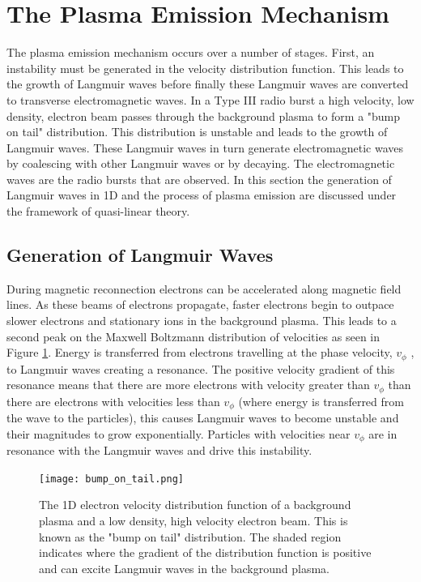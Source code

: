 \section{The Plasma Emission Mechanism}
\label{sec:plasma_emission}
The plasma emission mechanism occurs over a number of stages. First, an instability must be generated in the velocity distribution function. This leads to the growth of Langmuir waves before finally these Langmuir waves are converted to transverse electromagnetic waves. In a Type III radio burst a high velocity, low density, electron beam passes through the background plasma to form a "bump on tail" distribution. This distribution is unstable and leads to the growth of Langmuir waves. These Langmuir waves in turn generate electromagnetic waves by coalescing with other Langmuir waves or by decaying. The electromagnetic waves are the radio bursts that are observed. In this section the generation of Langmuir waves in 1D and the process of plasma emission are discussed under the framework of quasi-linear theory.

\subsection{Generation of Langmuir Waves}
During magnetic reconnection electrons can be accelerated along magnetic field lines. As these beams of electrons propagate, faster electrons begin to outpace slower electrons and stationary ions in the background plasma. This leads to a second peak on the Maxwell Boltzmann distribution of velocities as seen in Figure \ref{fig:bumpontail}. Energy is transferred from electrons travelling at the phase velocity, $v_{\phi}$ , to Langmuir waves creating a resonance.
The positive velocity gradient of this resonance means that there are more electrons with velocity greater than $v_{\phi}$ than there are electrons with velocities less than  $v_{\phi}$ (where energy is transferred from the wave to the particles), this causes Langmuir waves to become unstable and their magnitudes to grow exponentially. Particles with velocities near $v_{\phi}$ are in resonance with the Langmuir waves and drive this instability.

\begin{figure}[ht]
\centering
\texttt{[image: bump\_on\_tail.png]}
\caption[A "bump on tail" distribution.]{The 1D electron velocity distribution function of a background plasma and a low density, high velocity electron beam. This is known as the "bump on tail" distribution. The shaded region indicates where the gradient of the distribution function is positive and can excite Langmuir waves in the background plasma.}
\label{fig:bumpontail}
\end{figure}

